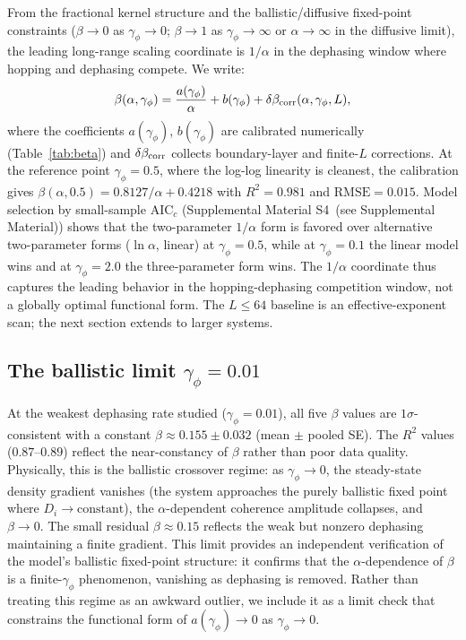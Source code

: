 \documentclass[aps,prb,twocolumn,superscriptaddress,floatfix]{revtex4-2}
\begin{document}
From the fractional kernel structure and the ballistic/diffusive fixed-point constraints ($\beta \to 0$ as $\gamma_\phi \to 0$; $\beta \to 1$ as $\gamma_\phi \to \infty$ or $\alpha \to \infty$ in the diffusive limit), the leading long-range scaling coordinate is $1/\alpha$ in the dephasing window where hopping and dephasing compete. We write:
\begin{equation}
\beta(\alpha,\gamma_\phi) = \frac{a(\gamma_\phi)}{\alpha} + b(\gamma_\phi) + \delta\beta_{\rm corr}(\alpha,\gamma_\phi,L),
\label{eq:beta_form}
\end{equation}
where the coefficients $a(\gamma_\phi)$, $b(\gamma_\phi)$ are calibrated numerically (Table~\ref{tab:beta}) and $\delta\beta_{\rm corr}$ collects boundary-layer and finite-$L$ corrections. At the reference point $\gamma_\phi = 0.5$, where the log-log linearity is cleanest, the calibration gives $\beta(\alpha, 0.5) = 0.8127/\alpha + 0.4218$ with $R^2 = 0.981$ and $\mathrm{RMSE} = 0.015$. Model selection by small-sample $\mathrm{AIC}_c$ (Supplemental Material S4~(see Supplemental Material)) shows that the two-parameter $1/\alpha$ form is favored over alternative two-parameter forms ($\ln\alpha$, linear) at $\gamma_\phi = 0.5$, while at $\gamma_\phi = 0.1$ the linear model wins and at $\gamma_\phi = 2.0$ the three-parameter form wins. The $1/\alpha$ coordinate thus captures the leading behavior in the hopping-dephasing competition window, not a globally optimal functional form. The $L \le 64$ baseline is an effective-exponent scan; the next section extends to larger systems.

\subsection{The ballistic limit $\gamma_\phi = 0.01$}
\label{sec:ballistic}

At the weakest dephasing rate studied ($\gamma_\phi = 0.01$), all five $\beta$ values are $1\sigma$-consistent with a constant $\beta \approx 0.155 \pm 0.032$ (mean $\pm$ pooled SE). The $R^2$ values ($0.87$--$0.89$) reflect the near-constancy of $\beta$ rather than poor data quality. Physically, this is the ballistic crossover regime: as $\gamma_\phi \to 0$, the steady-state density gradient vanishes (the system approaches the purely ballistic fixed point where $D_i \to \text{constant}$), the $\alpha$-dependent coherence amplitude collapses, and $\beta \to 0$. The small residual $\beta \approx 0.15$ reflects the weak but nonzero dephasing maintaining a finite gradient. This limit provides an independent verification of the model's ballistic fixed-point structure: it confirms that the $\alpha$-dependence of $\beta$ is a finite-$\gamma_\phi$ phenomenon, vanishing as dephasing is removed. Rather than treating this regime as an awkward outlier, we include it as a limit check that constrains the functional form of $a(\gamma_\phi) \to 0$ as $\gamma_\phi \to 0$.
\end{document}
